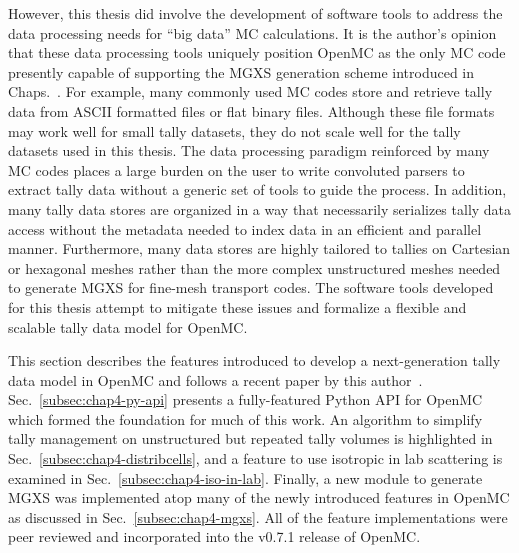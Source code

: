 However, this thesis did involve the development of software tools to address the data processing needs for ``big data'' \ac{MC} calculations. It is the author's opinion that these data processing tools uniquely position OpenMC as the only \ac{MC} code presently capable of supporting the \ac{MGXS} generation scheme introduced in Chaps.~. For example, many commonly used \ac{MC} codes store and retrieve tally data from \ac{ASCII} formatted files or flat binary files. Although these file formats may work well for small tally datasets, they do not scale well for the tally datasets used in this thesis. The data processing paradigm reinforced by many \ac{MC} codes places a large burden on the user to write convoluted parsers to extract tally data without a generic set of tools to guide the process. In addition, many tally data stores are organized in a way that necessarily serializes tally data access without the metadata needed to index data in an efficient and parallel manner. Furthermore, many data stores are highly tailored to tallies on Cartesian or hexagonal meshes rather than the more complex unstructured meshes needed to generate \ac{MGXS} for fine-mesh transport codes. The software tools developed for this thesis attempt to mitigate these issues and formalize a flexible and scalable tally data model for OpenMC.



This section describes the features introduced to develop a next-generation tally data model in OpenMC and follows a recent paper by this author~\cite{boyd2016bigdata}. Sec.~\ref{subsec:chap4-py-api} presents a fully-featured Python \ac{API} for OpenMC which formed the foundation for much of this work. An algorithm to simplify tally management on unstructured but repeated tally volumes is highlighted in Sec.~\ref{subsec:chap4-distribcells}, and a feature to use isotropic in lab scattering is examined in Sec.~\ref{subsec:chap4-iso-in-lab}. Finally, a new module to generate \ac{MGXS} was implemented atop many of the newly introduced features in OpenMC as discussed in Sec.~\ref{subsec:chap4-mgxs}. All of the feature implementations were peer reviewed and incorporated into the v0.7.1 release of OpenMC.

